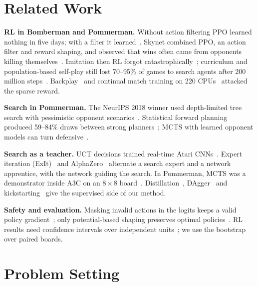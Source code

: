 \documentclass[runningheads]{llncs}
\begin{document}
\section{Related Work}

\textbf{RL in Bomberman and Pommerman.} Without action filtering PPO learned nothing in five days; with a filter it learned~\cite{gao2019hard}. Skynet combined PPO, an action filter and reward shaping, and observed that wins often came from opponents killing themselves~\cite{gao2019skynet}. Imitation then RL forgot catastrophically~\cite{meisheri2019}; curriculum and population-based self-play still lost 70--95\% of games to search agents after 200 million steps~\cite{huynh2024}. Backplay~\cite{resnick2018backplay} and continual match training on 220 CPUs~\cite{peng2018continual} attacked the sparse reward.

\textbf{Search in Pommerman.} The NeurIPS 2018 winner used depth-limited tree search with pessimistic opponent scenarios~\cite{osogami2019}. Statistical forward planning produced 59--84\% draws between strong planners~\cite{perezliebana2019}; MCTS with learned opponent models can turn defensive~\cite{weil2023}.

\textbf{Search as a teacher.} UCT decisions trained real-time Atari CNNs~\cite{guo2014uct}. Expert iteration (ExIt)~\cite{anthony2017exit} and AlphaZero~\cite{silver2017agz,silver2017alphazero} alternate a search expert and a network apprentice, with the network guiding the search. In Pommerman, MCTS was a demonstrator inside A3C on an $8\times8$ board~\cite{kartal2018demonstrator,kartal2019safer}. Distillation~\cite{hinton2015distill,rusu2016distill}, DAgger~\cite{ross2011dagger} and kickstarting~\cite{schmitt2018kickstart} give the supervised side of our method.

\textbf{Safety and evaluation.} Masking invalid actions in the logits keeps a valid policy gradient~\cite{huang2022masking}; only potential-based shaping preserves optimal policies~\cite{ng1999shaping}. RL results need confidence intervals over independent units~\cite{henderson2018matters,agarwal2021precipice}; we use the bootstrap~\cite{efron1979bootstrap} over paired boards.

\section{Problem Setting}
\label{sec:setting}
\end{document}
